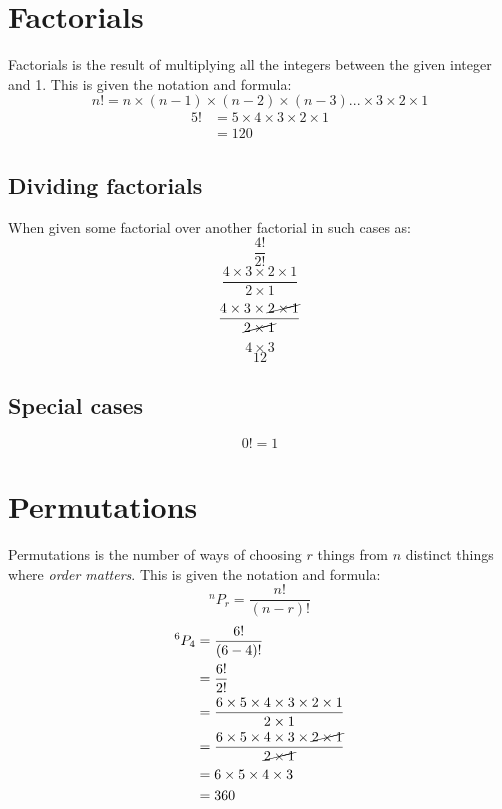 \documentclass{book}
\newcommand{\Perm}[2]{{}^#1P_{#2}}
\begin{document}
\chapter{Factorials}
Factorials is the result of multiplying all the integers between the given integer and 1.  This is given the notation and formula:
\[
	n! = n \times (n-1) \times (n-2) \times (n-3)... \times 3 \times 2 \times 1
\]
\begin{align*}
	5! & = 5 \times 4 \times 3 \times 2 \times 1 \\
	   & = 120
\end{align*}

\section{Dividing factorials}
When given some factorial over another factorial in such cases as:
\[
	\frac{4!}{2!}
\]
\[
	\frac{4 \times 3 \times 2 \times 1}{2 \times 1}
\]
\[
	\frac{4 \times 3 \times \cancel{2 \times 1}}{\cancel{2 \times 1}}
\]
\[
	4 \times 3
\]
\[
	12
\]

\section{Special cases}
\[
	0! = 1
\]

\chapter{Permutations}
Permutations is the number of ways of choosing $r$ things from $n$ distinct things where \emph{order matters}.  This is given the notation and formula:
\[
	^nP_r = \frac{n!}{(n-r)!}
\]
\begin{align*}
	\Perm{6}{4} & = \frac{6!}{(6 - 4)!}                                                                 \\
	            & = \frac{6!}{2!}                                                                       \\
	            & = \frac{6 \times 5 \times 4 \times 3 \times 2 \times 1}{2 \times 1}                   \\
	            & = \frac{6 \times 5 \times 4 \times 3 \times \cancel{2 \times 1}}{\cancel{2 \times 1}} \\
	            & = 6 \times 5 \times 4 \times 3                                                        \\
	            & = 360
\end{align*}
\end{document}
